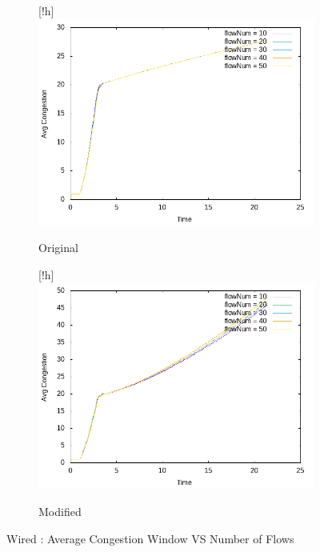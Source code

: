     \begin{figure}[!h]
    	\centering
    	
    	\begin{subfigure}{0.9\textwidth}[!h] %
    		\includegraphics[width=.95\textwidth]{Pictures/Wired/Original/Avg_CongestionVSflowNum.png}
    		\caption{Original} %
    	\end{subfigure}
    	
    	\vspace{1em} %
    	
    	\begin{subfigure}{0.9\textwidth}[!h] %
    		\includegraphics[width=.95\textwidth]{Pictures/Wired/Modified/Avg_CongestionVSflowNum.png}
    		\caption{Modified} %
    	\end{subfigure}
    	
    	\caption{Wired : Average Congestion Window VS Number of Flows} %
    \end{figure}
    
